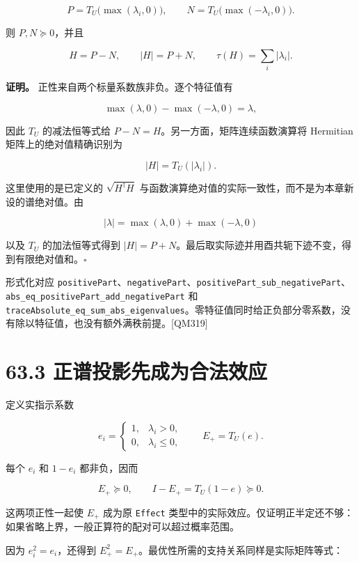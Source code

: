 \documentclass[
  11pt,
  oneside]{book}
\begin{document}
\[
P=T_U\bigl(\max(\lambda_i,0)\bigr),
\qquad
N=T_U\bigl(\max(-\lambda_i,0)\bigr).
\]

则 \(P,N\succeq0\)，并且

\[
H=P-N,\qquad |H|=P+N,
\qquad
\tau(H)=\sum_i|\lambda_i|.
\]

\textbf{证明。} 正性来自两个标量系数族非负。逐个特征值有

\[
\max(\lambda,0)-\max(-\lambda,0)=\lambda,
\]

因此 \(T_U\) 的减法恒等式给 \(P-N=H\)。另一方面，矩阵连续函数演算将
Hermitian 矩阵上的绝对值精确识别为

\[
|H|=T_U(|\lambda_i|).
\]

这里使用的是已定义的 \(\sqrt{H^\dagger H}\)
与函数演算绝对值的实际一致性，而不是为本章新设的谱绝对值。由

\[
|\lambda|=\max(\lambda,0)+\max(-\lambda,0)
\]

以及 \(T_U\) 的加法恒等式得到
\(|H|=P+N\)。最后取实际迹并用酉共轭下迹不变，得到有限绝对值和。\(\square\)

形式化对应
\texttt{positive\allowbreak Part}、\allowbreak \texttt{negative\allowbreak Part}、\allowbreak \texttt{positive\allowbreak Part\_\allowbreak sub\_\allowbreak negative\allowbreak Part}、\allowbreak \texttt{abs\_\allowbreak eq\_\allowbreak positive\allowbreak Part\_\allowbreak add\_\allowbreak negative\allowbreak Part}
和
\texttt{trace\allowbreak Absolute\_\allowbreak eq\_\allowbreak sum\_\allowbreak abs\_\allowbreak eigenvalues}。零特征值同时给正负部分零系数，没有除以特征值，也没有额外满秩前提。{[}QM319{]}

\section{63.3 正谱投影先成为合法效应}

定义实指示系数

\[
e_i=\begin{cases}
1,&\lambda_i>0,\\
0,&\lambda_i\le0,
\end{cases}
\qquad E_+=T_U(e).
\]

每个 \(e_i\) 和 \(1-e_i\) 都非负，因而

\[
E_+\succeq0,
\qquad
I-E_+=T_U(1-e)\succeq0.
\]

这两项正性一起使 \(E_+\) 成为原 \texttt{Effect}
类型中的实际效应。仅证明正半定还不够：如果省略上界，一般正算符的配对可以超过概率范围。

因为 \(e_i^2=e_i\)，还得到
\(E_+^2=E_+\)。最优性所需的支持关系同样是实际矩阵等式：
\end{document}
